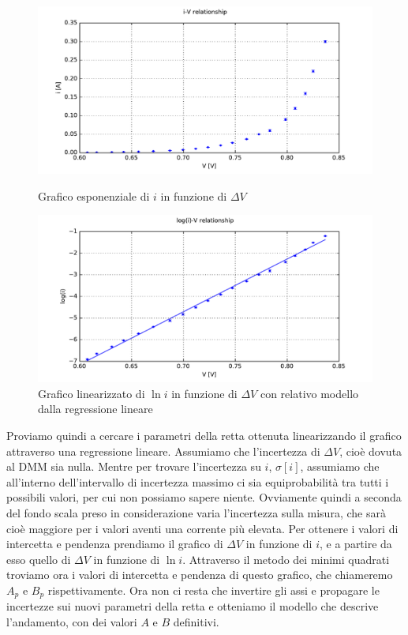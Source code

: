 \begin{figure}[h]
    \centering
    \begin{minipage}{0.49\textwidth}
        \centering
        \includegraphics[width=\textwidth]{fig1D.pdf} 
        \caption{Grafico esponenziale di $i$ in funzione di $\Delta V$}
        \label{fig:gDe}
    \end{minipage}\hfill
    \begin{minipage}{0.49\textwidth}
        \centering
        \includegraphics[width=\textwidth]{fig2D.pdf} 
        \caption{Grafico linearizzato di $\ln{i}$ in funzione di $\Delta V$ con relativo modello dalla regressione lineare}
        \label{fig:gDl}
    \end{minipage}
    
\end{figure}
    
Proviamo quindi a cercare i parametri della retta ottenuta linearizzando il grafico attraverso una regressione lineare. Assumiamo che l'incertezza di $\Delta V$, cioè dovuta al DMM sia nulla. Mentre per trovare l'incertezza su $i$, $\sigma[i]$, assumiamo che all'interno dell'intervallo di incertezza massimo ci sia equiprobabilità tra tutti i possibili valori, per cui non possiamo sapere niente. Ovviamente quindi a seconda del fondo scala preso in considerazione varia l'incertezza sulla misura, che sarà cioè maggiore per i valori aventi una corrente più elevata.
Per ottenere i valori di intercetta e pendenza prendiamo il grafico di $\Delta V$ in funzione di $i$, e a partire da esso quello di $\Delta V$ in funzione di $\ln{i}$. Attraverso il metodo dei minimi quadrati troviamo ora i valori di intercetta e pendenza di questo grafico, che chiameremo $A_p$ e $B_p$ rispettivamente. Ora non ci resta che invertire gli assi e propagare le incertezze sui nuovi parametri della retta e otteniamo il modello che descrive l'andamento, con dei valori $A$ e $B$ definitivi. \\

